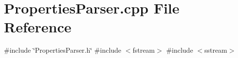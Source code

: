 \section{Properties\+Parser.\+cpp File Reference}
\label{_properties_parser_8cpp}
{\ttfamily \#include \char`\"{}Properties\+Parser.\+h\char`\"{}}\newline
{\ttfamily \#include $<$fstream$>$}\newline
{\ttfamily \#include $<$sstream$>$}\newline
